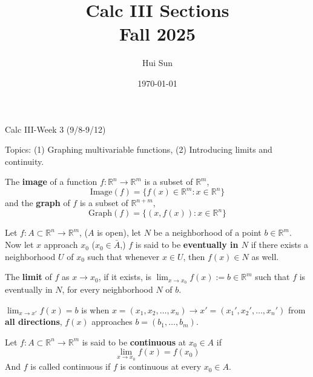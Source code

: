 \documentclass[openany]{book}
\title{Calc III Sections
\\ 
\vspace{0.4cm}
\large Fall 2025}
\date{\today}
\author{Hui Sun}
\newcommand{\R}{\mathbb{R}}
\begin{document}
\maketitle

\newpage


\begin{center}
    \Large Calc III-Week 3 (9/8-9/12)
\end{center}

\renewcommand\thesection{\arabic{section}}

\noindent
Topics: (1) Graphing multivariable functions, (2) Introducing limits and continuity.

\begin{defn}[graph]
    The \textbf{image} of a function $f: \R^n\to\R^m$ is a subset of $\R^m$,
    \begin{equation*}
        \text{Image}(f)=\{f(x)\in\R^m: x\in\R^n\}
    \end{equation*}
    and the \textbf{graph} of $f$ is a subset of $\R^{n+m}$,
    \begin{equation*}
        \text{Graph}(f)=\{(x,f(x)): x\in\R^n\}
    \end{equation*}
\end{defn}



\begin{defn}[limit]
    Let $f: A\subset\R^n\to\R^m$, ($A$ is open), let $N$ be a neighborhood of a point $b\in\R^m$. Now let $x$ approach $x_0$ ($x_0\in\bar{A}$,) $f$ is said to be \textbf{eventually in $N$} if there exists a neighborhood $U$ of $x_0$ such that whenever $x\in U$, then $f(x)\in N$ as well. 

    The \textbf{limit} of $f$ as $x\to x_0$, if it exists, is $\lim_{x\to x_0}f(x):=b\in\R^m$ such that $f$ is eventually in $N$, for every neighborhood $N$ of $b$. 
\end{defn}

\begin{defn}[limit']
    $\lim_{x\to x'}f(x)=b$ is when $x=(x_1, x_2, \dots, x_n)\to x'=(x_1',x_2',\dots, x_n')$ from \textbf{all directions}, $f(x)$ approaches $b=(b_1,\dots, b_m)$.
\end{defn}



\begin{defn}[continuity]
    Let $f:A\subset\R^n\to\R^m$ is said to be \textbf{continuous} at $x_0\in A$ if 
    \begin{equation*}
        \lim_{x\to x_0}f(x)=f(x_0)
    \end{equation*}
    And $f$ is called continuous if $f$ is continuous at every $x_0\in A$.
\end{defn}
\end{document}

